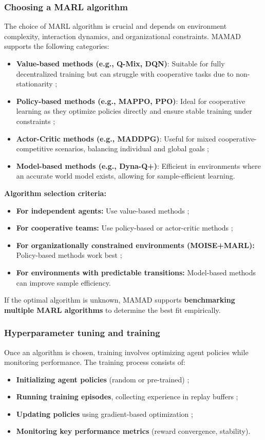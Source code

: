 \documentclass[pdflatex,sn-mathphys-num]{sn-jnl}%
\theoremstyle{thmstyleone}%
\theoremstyle{thmstyletwo}%
\theoremstyle{thmstylethree}%
\begin{document}
\subsubsection{Choosing a MARL algorithm}
The choice of MARL algorithm is crucial and depends on environment complexity, interaction dynamics, and organizational constraints. MAMAD supports the following categories:

\begin{itemize}
    \item \textbf{Value-based methods (e.g., Q-Mix, DQN)}: Suitable for fully decentralized training but can struggle with cooperative tasks due to non-stationarity ;
    \item \textbf{Policy-based methods (e.g., MAPPO, PPO)}: Ideal for cooperative learning as they optimize policies directly and ensure stable training under constraints ;
    \item \textbf{Actor-Critic methods (e.g., MADDPG)}: Useful for mixed cooperative-competitive scenarios, balancing individual and global goals ;
    \item \textbf{Model-based methods (e.g., Dyna-Q+)}: Efficient in environments where an accurate world model exists, allowing for sample-efficient learning.
\end{itemize}

\noindent \textbf{Algorithm selection criteria:}
\begin{itemize}
    \item \textbf{For independent agents:} Use value-based methods ;
    \item \textbf{For cooperative teams:} Use policy-based or actor-critic methods ;
    \item \textbf{For organizationally constrained environments (MOISE+MARL):} Policy-based methods work best ;
    \item \textbf{For environments with predictable transitions:} Model-based methods can improve sample efficiency.
\end{itemize}

\noindent If the optimal algorithm is unknown, MAMAD supports \textbf{benchmarking multiple MARL algorithms} to determine the best fit empirically.

\subsubsection{Hyperparameter tuning and training}
Once an algorithm is chosen, training involves optimizing agent policies while monitoring performance. The training process consists of:
\begin{itemize}
    \item \textbf{Initializing agent policies} (random or pre-trained) ;
    \item \textbf{Running training episodes}, collecting experience in replay buffers ;
    \item \textbf{Updating policies} using gradient-based optimization ;
    \item \textbf{Monitoring key performance metrics} (reward convergence, stability).
\end{itemize}
\end{document}
